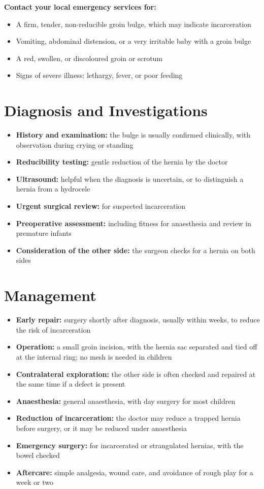 \textbf{Contact your local emergency services for:}
\begin{itemize}
    \item A firm, tender, non-reducible groin bulge, which may indicate incarceration
    \item Vomiting, abdominal distension, or a very irritable baby with a groin bulge
    \item A red, swollen, or discoloured groin or scrotum
    \item Signs of severe illness: lethargy, fever, or poor feeding
\end{itemize}

\section*{Diagnosis and Investigations}
\begin{itemize}
    \item \textbf{History and examination:} the bulge is usually confirmed clinically, with observation during crying or standing
    \item \textbf{Reducibility testing:} gentle reduction of the hernia by the doctor
    \item \textbf{Ultrasound:} helpful when the diagnosis is uncertain, or to distinguish a hernia from a hydrocele
    \item \textbf{Urgent surgical review:} for suspected incarceration
    \item \textbf{Preoperative assessment:} including fitness for anaesthesia and review in premature infants
    \item \textbf{Consideration of the other side:} the surgeon checks for a hernia on both sides
\end{itemize}

\section*{Management}
\begin{itemize}
    \item \textbf{Early repair:} surgery shortly after diagnosis, usually within weeks, to reduce the risk of incarceration
    \item \textbf{Operation:} a small groin incision, with the hernia sac separated and tied off at the internal ring; no mesh is needed in children
    \item \textbf{Contralateral exploration:} the other side is often checked and repaired at the same time if a defect is present
    \item \textbf{Anaesthesia:} general anaesthesia, with day surgery for most children
    \item \textbf{Reduction of incarceration:} the doctor may reduce a trapped hernia before surgery, or it may be reduced under anaesthesia
    \item \textbf{Emergency surgery:} for incarcerated or strangulated hernias, with the bowel checked
    \item \textbf{Aftercare:} simple analgesia, wound care, and avoidance of rough play for a week or two
\end{itemize}


